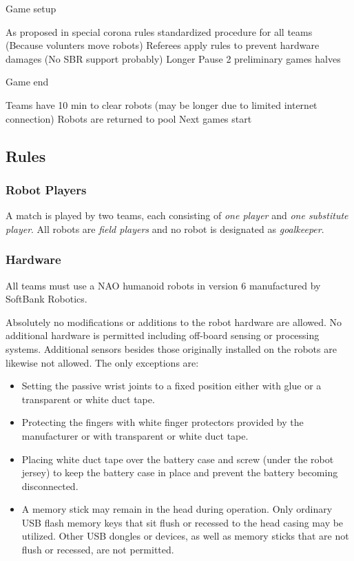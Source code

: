 Game setup

    As proposed in special corona rules
    standardized procedure for all teams (Because volunters move robots)
    Referees apply rules to prevent hardware damages (No SBR support probably)
    Longer Pause
    2 preliminary games halves

Game end

    Teams have 10 min to clear robots (may be longer due to limited internet connection)
    Robots are returned to pool
    Next games start



\subsection{Rules}

\subsubsection{Robot Players}
\label{sec:robot_players}
A match is played by two teams, each consisting of \emph{one player} and \emph{one substitute player}. All robots are \emph{field players} and no robot is designated as \emph{goalkeeper}.

\subsubsection{Hardware}
\label{sec:hardware}
All teams must use a NAO humanoid robots in version 6 manufactured by SoftBank Robotics.

Absolutely no modifications or additions to the robot hardware are allowed. No additional hardware is permitted including off-board sensing or processing systems. Additional sensors besides those originally installed on the robots are likewise not allowed. The only exceptions are:
\begin{itemize}
	\item Setting the passive wrist joints to a fixed position either with glue or a transparent or white duct tape.
	\item Protecting the fingers with white finger protectors provided by the manufacturer or with transparent or white duct tape.
	\item Placing white duct tape over the battery case and screw (under the robot jersey) to keep the battery case in place and prevent the battery becoming disconnected.
	\item A memory stick may remain in the head during operation.  Only ordinary USB flash memory keys that sit flush or recessed to the head casing may be utilized. Other USB dongles or devices, as well as memory sticks that are not flush or recessed, are not permitted.
\end{itemize}

